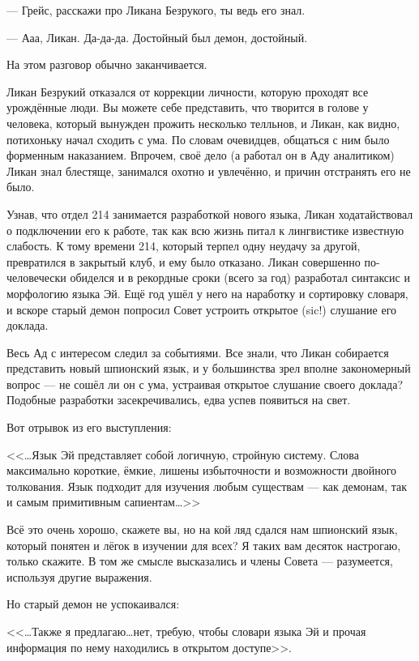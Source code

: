 \documentclass[a4paper,10pt]{book}
\begin{document}
--- Грейс, расскажи про Ликана Безрукого, ты ведь его знал.

--- Ааа, Ликан. Да-да-да. Достойный был демон, достойный.

На этом разговор обычно заканчивается.

Ликан Безрукий отказался от коррекции личности, которую проходят все урождённые 
люди. Вы можете себе представить, что творится в голове у человека, который 
вынужден прожить несколько телльнов, и Ликан, как видно, потихоньку начал 
сходить с ума. По словам очевидцев, общаться с ним было форменным наказанием. 
Впрочем, своё дело (а работал он в Аду аналитиком) Ликан знал блестяще, 
занимался охотно и увлечённо, и причин отстранять его не было.

Узнав, что отдел 214 занимается разработкой нового языка, Ликан ходатайствовал 
о подключении его к работе, так как всю жизнь питал к лингвистике известную 
слабость. К тому времени 214, который терпел одну неудачу за другой, 
превратился в закрытый клуб, и ему было отказано. Ликан совершенно 
по-человечески обиделся и в рекордные сроки (всего за год) разработал синтаксис 
и морфологию языка Эй. Ещё год ушёл у него на наработку и сортировку словаря, и 
вскоре старый демон попросил Совет устроить открытое (sic!) слушание его 
доклада.

Весь Ад с интересом следил за событиями. Все знали, что Ликан собирается 
представить новый шпионский язык, и у большинства зрел вполне закономерный 
вопрос --- не сошёл ли он с ума, устраивая открытое слушание своего доклада? 
Подобные разработки засекречивались, едва успев появиться на свет.

Вот отрывок из его выступления:

<<\dots Язык Эй представляет собой логичную, стройную систему. Слова 
максимально 
короткие, ёмкие, лишены избыточности и возможности двойного толкования. Язык 
подходит для изучения любым существам --- как демонам, так и самым примитивным 
сапиентам\dots>>

Всё это очень хорошо, скажете вы, но на кой ляд сдался нам шпионский язык, 
который понятен и лёгок в изучении для всех? Я таких вам десяток настрогаю, 
только скажите. В том же смысле высказались и члены Совета --- разумеется, 
используя другие выражения.

Но старый демон не успокаивался:

<<\dots Также я предлагаю\ldots нет, требую, чтобы словари языка Эй и прочая 
информация по нему находились в открытом доступе>>.
\end{document}

